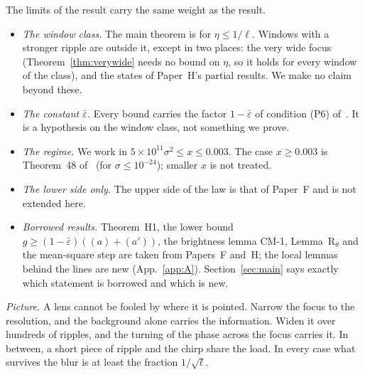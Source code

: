 The limits of the result carry the same weight as the result.
\begin{itemize}
\item \emph{The window class.} The main theorem is for $\eta\le1/\ell$. Windows with a stronger ripple are outside it, except in two places: the very wide focus (Theorem~\ref{thm:verywide} needs no bound on $\eta$, so it holds for every window of the class), and the states of Paper~H's partial results. We make no claim beyond these.
\item \emph{The constant $\bar\varepsilon$.} Every bound carries the factor $1-\bar\varepsilon$ of condition (P6) of~\cite{F}. It is a hypothesis on the window class, not something we prove.
\item \emph{The regime.} We work in $5\times10^{11}\sigma^2\le x\le0.003$. The case $x\ge0.003$ is Theorem~48 of~\cite{F} (for $\sigma\le10^{-24}$); smaller $x$ is not treated.
\item \emph{The lower side only.} The upper side of the law is that of Paper~F and is not extended here.
\item \emph{Borrowed results.} Theorem~H1, the lower bound $g\ge(1-\bar\varepsilon)((a)+(a'))$, the brightness lemma CM-1, Lemma~R$_\theta$ and the mean-square step are taken from Papers~F and~H; the local lemmas behind the lines are new (App.~\ref{app:A}). Section~\ref{sec:main} says exactly which statement is borrowed and which is new.
\end{itemize}

\emph{Picture.}
A lens cannot be fooled by where it is pointed.
Narrow the focus to the resolution, and the background alone carries the information.
Widen it over hundreds of ripples, and the turning of the phase across the focus carries it.
In between, a short piece of ripple and the chirp share the load.
In every case what survives the blur is at least the fraction $1/\sqrt\ell$.
